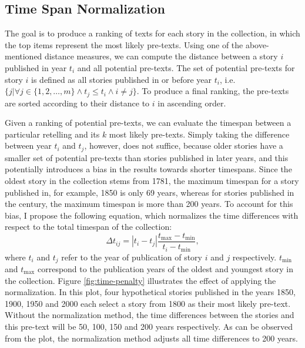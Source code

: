 \subsection{Time Span Normalization}
The goal is to produce a ranking of texts for each story in the collection, in which the top items represent the most likely pre-texts. Using one of the above-mentioned distance measures, we can compute the distance between a story $i$ published in year $t_i$ and all potential pre-texts. The set of potential pre-texts for story $i$ is defined as all stories published in or before year $t_i$, i.e.\ $\{j | \forall j \in \{1, 2, \ldots, m\} \wedge t_j \leq t_i \wedge i \neq j\}$. To produce a final ranking, the pre-texts are sorted according to their distance to $i$ in ascending order. 

Given a ranking of potential pre-texts, we can evaluate the timespan between a particular retelling and its $k$ most likely pre-texts. Simply taking the difference between year $t_i$ and $t_j$, however, does not suffice, because older stories have a smaller set of potential pre-texts than stories published in later years, and this potentially introduces a bias in the results towards shorter timespans. Since the oldest story in the collection stems from 1781, the maximum timespan for a story published in, for example, 1850 is only 69 years, whereas for stories published in the  century, the maximum timespan is more than 200 years. To account for this bias, I propose the following equation, which normalizes the time differences with respect to the total timespan of the collection:
\begin{equation}
\Delta t_{ij} = | t_i - t_j | \frac{t_{\max} - t_{\min}}{t_i - t_{\min}},
\label{eq:timepenalty}
\end{equation}
where $t_i$ and $t_j$ refer to the year of publication of story $i$ and $j$ respectively. $t_{\min}$ and $t_{\max}$ correspond to the publication years of the oldest and youngest story in the collection. Figure \ref{fig:time-penalty} illustrates the effect of applying the normalization. In this plot, four hypothetical stories published in the years 1850, 1900, 1950 and 2000 each select a story from 1800 as their most likely pre-text. Without the normalization method, the time differences between the stories and this pre-text will be 50, 100, 150 and 200 years respectively. As can be observed from the plot, the normalization method adjusts all time differences to 200 years.

